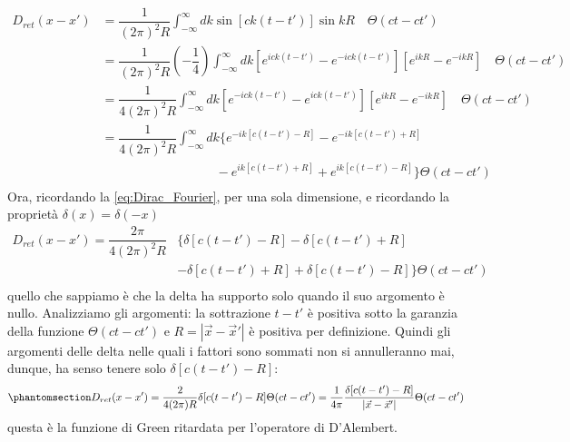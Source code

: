 \begin{equation}
   \begin{aligned}
        D_{ret}(x-x')&=\dfrac{1}{(2\pi)^2R}\int_{-\infty}^\infty dk\sin{[ck(t-t')]} \sin{kR}  \quad\Theta(ct-ct')\\
        &=\dfrac{1}{(2\pi)^2R}\left(-\dfrac{1}{4}\right)\int_{-\infty}^\infty dk [e^{ick(t-t')}-e^{-ick(t-t')}][e^{ikR}-e^{-ikR}]  \quad\Theta(ct-ct')\\
        &=\dfrac{1}{4(2\pi)^2R}\int_{-\infty}^\infty dk [e^{-ick(t-t')}-e^{ick(t-t')}][e^{ikR}-e^{-ikR}]  \quad\Theta(ct-ct')\\
         &=\dfrac{1}{4(2\pi)^2R}\int_{-\infty}^\infty dk \{e^{-ik[c(t-t')-R]}-e^{-ik[c(t-t')+R]}\\&\qquad \qquad\qquad\qquad\quad-e^{ik[c(t-t')+R]}+e^{ik[c(t-t')-R]} \}\Theta(ct-ct')\\
   \end{aligned}
\end{equation}
Ora, ricordando la \eqref{eq:Dirac_Fourier}, per una sola dimensione, e ricordando la proprietà $\delta(x)=\delta(-x)$
\begin{equation}
   \begin{aligned}
        D_{ret}(x-x')=\dfrac{2\pi}{4(2\pi)^2R}&\{ \delta[c(t-t')-R]-\delta[c(t-t')+R]\\
       & -\delta[c(t-t')+R]+\delta[c(t-t')-R] \}\Theta(ct-ct')\\
   \end{aligned}
\end{equation}
quello che sappiamo è che la delta ha supporto solo quando il suo argomento è nullo. Analizziamo gli argomenti: la sottrazione $t-t'$ è positiva sotto la garanzia della funzione $\Theta(ct-ct')$ e $R=|\Vec{x}-\Vec{x}'|$ è positiva per definizione. Quindi gli argomenti delle delta nelle quali i fattori sono sommati non si annulleranno mai, dunque, ha senso tenere solo $\delta[c(t-t')-R]$:
\begin{equation}\phantomsection\label{eq:Green_ret}
        D_{ret}(x-x')=\dfrac{2}{4(2\pi)R}\delta[c(t-t')-R]\Theta(ct-ct')=\dfrac{1}{4\pi}\dfrac{\delta[c(t-t')-R]}{|\Vec{x}-\Vec{x}'|}\Theta(ct-ct')
\end{equation}
questa è la funzione di Green ritardata per l'operatore di D'Alembert.


